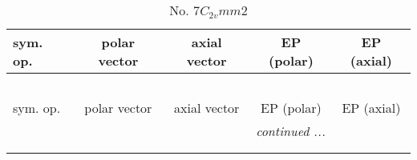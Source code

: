\documentclass[fleqn,10pt,landscape]{jsarticle}
\begin{document}
\begin{center}
\renewcommand{\arraystretch}{1.3}
\begin{longtable}{lcccc}
\caption{No. 7\quad$C_{2v}$\quad$mm2$\quad[ orthorhombic ]}
 \\
 \hline \hline
sym. op. & polar vector & axial vector & EP (polar) & EP (axial) \\ \hline \endfirsthead

\multicolumn{4}{l}{\tablename\ \thetable{}} \\
 \hline \hline
sym. op. & polar vector & axial vector & EP (polar) & EP (axial) \\ \hline \endhead

 \hline \hline
\multicolumn{4}{r}{\footnotesize\it continued ...} \\ \endfoot

 \hline \hline
\multicolumn{4}{r}{} \\ \endlastfoot


\end{longtable}
\end{center}
\end{document}
